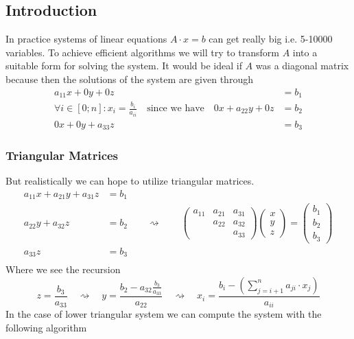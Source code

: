 \subsection{Introduction}
In practice systems of linear equations \(A \cdot x = b\) can get really big i.e. 5-10000 variables.
To achieve efficient algorithms we will try to transform \(A\) into a suitable form for solving the system.
It would be ideal if \(A\) was a diagonal matrix because then the solutions of the system are given through
\begin{equation*}
   \begin{split}
      a_{11}x + 0y + 0z & = b_1\\
      \forall i \in [0; n]: x_i = \frac{b_i}{a_{ii}} \quad\text{since we have}\quad 0x + a_{22}y + 0z & = b_2\\
      0x + 0y + a_{33}z & = b_3
   \end{split}
\end{equation*}

\subsubsection{Triangular Matrices}
But realistically we can hope to utilize triangular matrices.
\begin{equation*}
   \begin{split}
      a_{11}x + a_{21}y + a_{31}z & = b_1\\
      a_{22}y + a_{32}z & = b_2 \qquad\rightsquigarrow\qquad
      \begin{pmatrix}a_{11} & a_{21} & a_{31}\\ & a_{22} & a_{32}\\ & & a_{33}\end{pmatrix}
      \begin{pmatrix}x\\y\\z\end{pmatrix} = \begin{pmatrix}b_1\\b_2\\b_3\end{pmatrix}\\
      a_{33}z & = b_3\\
   \end{split}
\end{equation*}
Where we see the recursion
\[z = \frac{b_3}{a_{33}} \quad\rightsquigarrow\quad y = \frac{b_2 - a_{32} \frac{b_3}{a_{33}}}{a_{22}} \quad\rightsquigarrow\quad x_i = \frac{b_i - \left(\sum_{j=i+1}^n a_{ji} \cdot x_j\right)}{a_{ii}}\]
In the case of lower triangular system we can compute the system with the following algorithm

